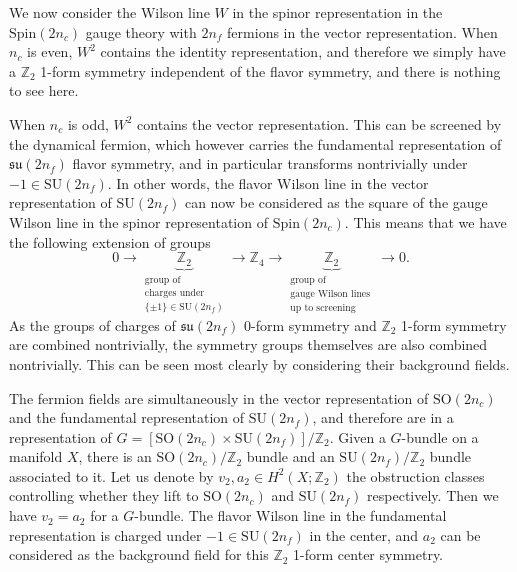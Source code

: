 \documentclass[12pt]{article}
\numberwithin{equation}{section}
\def\bZ{\mathbb{Z}}
\def\SU{\mathrm{SU}}
\def\SO{\mathrm{SO}}
\def\su{\mathfrak{su}}
\def\Spin{\mathrm{Spin}}
\begin{document}
We now consider the Wilson line $W$ in the spinor representation in the $\Spin(2n_c)$ gauge theory with $2n_f$ fermions in the vector representation.
When $n_c$ is even, $W^2$ contains the identity representation, and therefore we simply have a $\bZ_2$ 1-form symmetry independent of the flavor symmetry, and there is nothing to see here.

When $n_c$ is odd, $W^2$ contains the vector representation.
This can be screened by the dynamical fermion, which however carries the fundamental representation of $\su(2n_f)$ flavor symmetry, 
and in particular transforms nontrivially under $-1\in \SU(2n_f)$.
In other words, the flavor Wilson line in the vector representation of $\SU(2n_f)$ can now be considered as the square  of the gauge Wilson line in the spinor representation of $\Spin(2n_c)$.
This means that we have the following extension of groups \begin{equation}
0\to \underbrace{\bZ_2}_{\substack{\text{group of}\\
\text{charges under}\\
\text{$\{\pm1\}\in \SU(2n_f)$}}}
\to \bZ_4 
\to \underbrace{\bZ_2}_{\substack{\text{group of}\\\text{gauge Wilson lines }\\
\text{up to screening}}} \to 0.
\label{charge-extension}
\end{equation}
As the groups of charges of $\su(2n_f)$ 0-form symmetry and $\bZ_2$ 1-form symmetry are combined nontrivially, 
the symmetry groups themselves are also combined nontrivially.
This can be seen most clearly by considering their background fields.

The fermion fields are simultaneously in the vector representation of $\SO(2n_c)$ and the fundamental representation of $\SU(2n_f)$,
and therefore are in a representation of $G=[\SO(2n_c)\times \SU(2n_f)]/\bZ_2$.
Given a $G$-bundle on a manifold $X$,
there is an $\SO(2n_c)/\bZ_2$ bundle and an $\SU(2n_f)/\bZ_2$ bundle associated to it.
Let us denote by $v_2,a_2\in H^2(X;\bZ_2)$ the obstruction classes controlling whether they lift to $\SO(2n_c)$ and $\SU(2n_f)$ respectively. 
Then we have $v_2=a_2$ for a $G$-bundle.
The flavor Wilson line in the fundamental representation is charged under $-1\in \SU(2n_f)$ in the center,
and $a_2$ can be considered as the background field for this $\bZ_2$ 1-form center symmetry.
\end{document}
